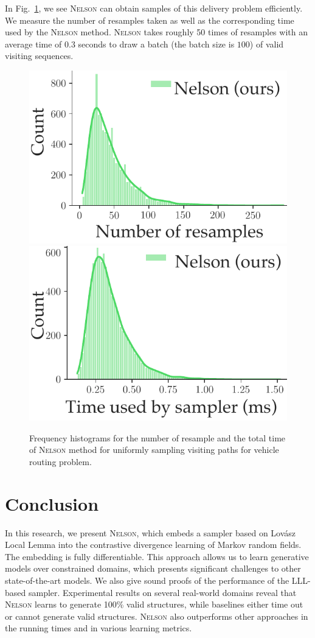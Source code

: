 \documentclass[letterpaper]{article} %
\newcommand{\lovasz}{{Lov\'asz}\xspace}
\newcommand{\nls}{\textsc{Nelson}\xspace}
\begin{document}
In Fig.~\ref{fig:route}, we see  \nls can obtain samples of this delivery problem efficiently. We measure the number of resamples taken as well as the corresponding time used  by the \nls method. \nls takes roughly 50 times of resamples with an average time of $0.3$ seconds to draw a batch (the batch size is $100$) of valid visiting sequences.

\begin{figure}[!t]
    \centering
    \includegraphics[width=0.495\linewidth]{exp/sat/vehicle.resamples.pdf}
    \includegraphics[width=0.495\linewidth]{exp/sat/vehicle.time.pdf}
    \caption{Frequency histograms for the number of resample and the total time of \nls method for uniformly sampling visiting paths for vehicle routing problem.}
    \label{fig:route}
\end{figure}

\section{Conclusion}
In this research, we present \nls, which  embeds a sampler based on \lovasz Local Lemma into the contrastive divergence learning of Markov random fields. The embedding is fully differentiable. This approach allows us to learn generative models over constrained domains, which presents significant challenges to other state-of-the-art models.
We also give sound proofs of the performance of the LLL-based sampler.
%
Experimental results on several real-world domains reveal that \nls learns to generate 100\% valid structures, while baselines either time out or cannot generate valid structures.
%
\nls also outperforms other approaches in the running times and in various learning metrics.
\end{document}
